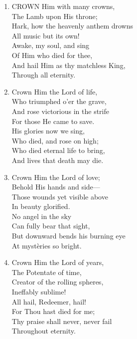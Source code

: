 \begin{enumerate}
    \item CROWN Him with many crowns, \\
        The Lamb upon His throne; \\
        Hark, how the heavenly anthem drowns \\
        All music but its own! \\
        Awake, my soul, and sing \\
        Of Him who died for thee, \\
        And hail Him as thy matchless King, \\
        Through all eternity.

    \item Crown Him the Lord of life, \\
        Who triumphed o'er the grave, \\
        And rose victorious in the strife \\
        For those He came to save. \\
        His glories now we sing, \\
        Who died, and rose on high; \\
        Who died eternal life to bring, \\
        And lives that death may die.

    \item Crown Him the Lord of love; \\
        Behold His hands and side--- \\
        Those wounds yet visible above \\
        In beauty glorified. \\
        No angel in the sky \\
        Can fully bear that sight, \\
        But downward bends his burning eye \\
        At myst\`eries so bright.

    \item Crown Him the Lord of years, \\
        The Potentate of time, \\
        Creator of the rolling spheres, \\
        Ineffably sublime! \\
        All hail, Redeemer, hail! \\
        For Thou hast died for me; \\
        Thy praise shall never, never fail \\
        Throughout eternity.

\end{enumerate}

